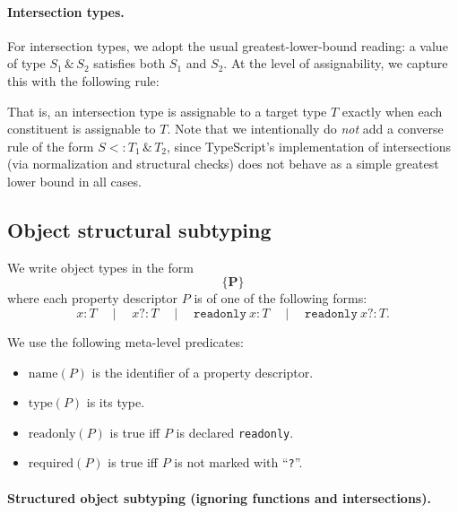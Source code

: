 \documentclass{article}
\begin{document}
\paragraph{Intersection types.}

For intersection types, we adopt the usual greatest-lower-bound reading: a value of type
$S_1 \,\&\, S_2$ satisfies both $S_1$ and $S_2$. At the level of assignability, we capture
this with the following rule:

\begin{prooftree}
\end{prooftree}

That is, an intersection type is assignable to a target type $T$ exactly when each
constituent is assignable to $T$. Note that we intentionally do \emph{not} add a converse
rule of the form $S \mathrel{<:} T_1 \,\&\, T_2$, since TypeScript's implementation of
intersections (via normalization and structural checks) does not behave as a simple
greatest lower bound in all cases.

\subsection*{Object structural subtyping}


We write object types in the form
\[
  \{ \boldsymbol{P} \}
\]
where each property descriptor $P$ is of one of the following forms:
\[
  x : T \quad\mid\quad x? : T \quad\mid\quad \texttt{readonly}\ x : T \quad\mid\quad \texttt{readonly}\ x? : T.
\]

We use the following meta-level predicates:
\begin{itemize}
  \item $\mathrm{name}(P)$ is the identifier of a property descriptor.
  \item $\mathrm{type}(P)$ is its type.
  \item $\mathrm{readonly}(P)$ is true iff $P$ is declared \texttt{readonly}.
  \item $\mathrm{required}(P)$ is true iff $P$ is not marked with ``\texttt{?}''.
\end{itemize}

\paragraph{Structured object subtyping (ignoring functions and intersections).}
\end{document}
